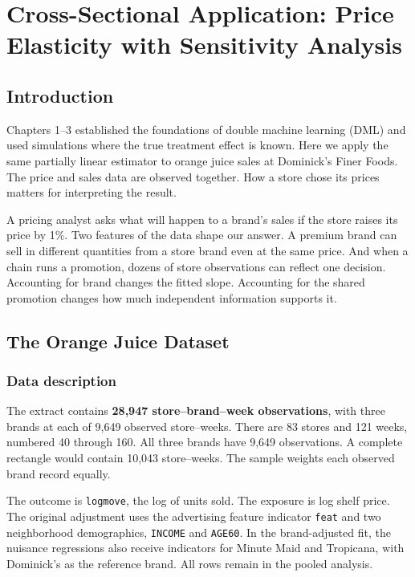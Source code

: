 \chapter{Cross-Sectional Application: Price Elasticity with Sensitivity Analysis}\label{ch:cross_sectional_application}

\section{Introduction}\label{sec:ch04_introduction}

Chapters 1--3 established the foundations of double machine learning (DML) and used simulations where the true treatment effect is known. Here we apply the same partially linear estimator to orange juice sales at Dominick's Finer Foods. The price and sales data are observed together. How a store chose its prices matters for interpreting the result.

A pricing analyst asks what will happen to a brand's sales if the store raises its price by 1\%. Two features of the data shape our answer. A premium brand can sell in different quantities from a store brand even at the same price. And when a chain runs a promotion, dozens of store observations can reflect one decision. Accounting for brand changes the fitted slope. Accounting for the shared promotion changes how much independent information supports it.

\section{The Orange Juice Dataset}\label{sec:oj_dataset}

\subsection{Data description}

The extract contains \textbf{28,947 store--brand--week observations}, with three brands at each of 9,649 observed store--weeks. There are 83 stores and 121 weeks, numbered 40 through 160. All three brands have 9,649 observations. A complete rectangle would contain 10,043 store--weeks. The sample weights each observed brand record equally.

The outcome is \texttt{logmove}, the log of units sold. The exposure is log shelf price. The original adjustment uses the advertising feature indicator \texttt{feat} and two neighborhood demographics, \texttt{INCOME} and \texttt{AGE60}. In the brand-adjusted fit, the nuisance regressions also receive indicators for Minute Maid and Tropicana, with Dominick's as the reference brand. All rows remain in the pooled analysis.

